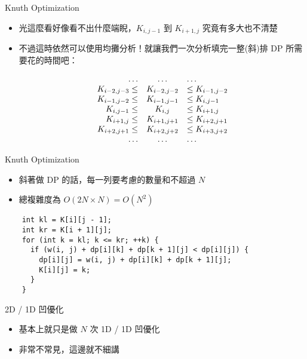 \documentclass[standalone]{beamer}
\begin{document}
\begin{frame}{Knuth Optimization}
  \begin{itemize}
    \item 光這麼看好像看不出什麼端睨，$K_{i,j-1}$ 到 $K_{i+1,j}$ 究竟有多大也不清楚
    \item 不過這時依然可以使用均攤分析！就讓我們一次分析填完一整(斜)排 DP 所需要花的時間吧：

    \[
    \begin{array}{r c l}
               \dots &    \dots    & \dots \\
    K_{i-2,j-3} \leq & K_{i-2,j-2} & \leq K_{i-1,j-2} \\
    K_{i-1,j-2} \leq & K_{i-1,j-1} & \leq K_{i,j-1} \\
    K_{i,j-1}   \leq & K_{i,j}     & \leq K_{i+1,j} \\
    K_{i+1,j}   \leq & K_{i+1,j+1} & \leq K_{i+2,j+1} \\
    K_{i+2,j+1} \leq & K_{i+2,j+2} & \leq K_{i+3,j+2}  \\
               \dots &    \dots    & \dots
    \end{array}
    \]
  \end{itemize}
\end{frame}

\begin{frame}{Knuth Optimization}
  \begin{itemize}
    \item 斜著做 DP 的話，每一列要考慮的數量和不超過 $N$
    \item 總複雜度為 $O(2N \times N) = O(N^2)$
  \end{itemize}
\end{frame}

\begin{frame}[fragile]{}
  \begin{verbatim}
    int kl = K[i][j - 1];
    int kr = K[i + 1][j];
    for (int k = kl; k <= kr; ++k) {
      if (w(i, j) + dp[i][k] + dp[k + 1][j] < dp[i][j]) {
        dp[i][j] = w(i, j) + dp[i][k] + dp[k + 1][j];
        K[i][j] = k;
      }
    }
  \end{verbatim}
\end{frame}

\begin{frame}{2D / 1D 凹優化}
  \begin{itemize}
    \item 基本上就只是做 $N$ 次 1D / 1D 凹優化
    \item 非常不常見，這邊就不細講
  \end{itemize}
\end{frame}
\end{document}
